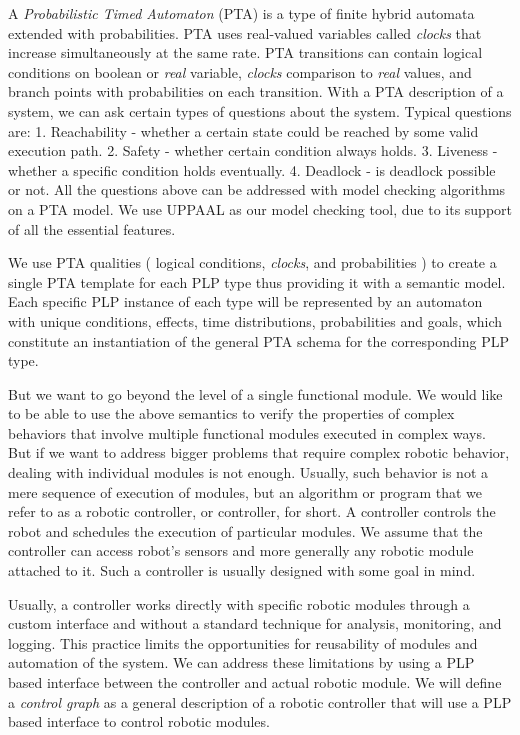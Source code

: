 \par A \textit{Probabilistic Timed Automaton} (PTA) is a type of finite hybrid automata extended with probabilities. PTA uses real-valued variables called \textit{clocks} that increase simultaneously at the same rate. PTA transitions can contain logical conditions on boolean or \textit{real} variable, \textit{clocks} comparison to \textit{real} values, and branch points with probabilities on each transition. With a PTA description of a system, we can ask certain types of questions about the system. Typical questions are: 1. Reachability - whether a certain state could be reached by some valid execution path. 2. Safety - whether certain condition always holds. 3. Liveness - whether a specific condition holds eventually. 4. Deadlock - is deadlock possible or not. All the questions above can be addressed with model checking algorithms on a PTA model. We use UPPAAL \cite{uppaalIntroduction} \cite{tutorialUppaal} as our model checking tool, due to its support of all the essential features.
\par We use PTA qualities ( logical conditions, \textit{clocks}, and probabilities ) to create a single PTA template for each PLP type thus providing it with a semantic model. Each specific PLP instance of each type will be represented by an automaton with unique conditions, effects, time distributions, probabilities and goals, which constitute an instantiation of the general PTA schema for the corresponding PLP type. 
\par But we want to go beyond the level of a single functional module. We would like to be able to use the above semantics to verify the properties of complex behaviors that involve multiple functional modules executed in complex ways. But if we want to address bigger problems that require complex robotic behavior, dealing with individual modules is not enough. Usually, such behavior is not a mere sequence of execution of modules, but an algorithm or program that we refer to as a robotic controller, or controller, for short. A controller controls the robot and schedules the execution of particular modules. We assume that the controller can access robot’s sensors and more generally any robotic module attached to it. Such a controller is usually designed with some goal in mind.
\par Usually, a controller works directly with specific robotic modules through a custom interface and without a standard technique for analysis, monitoring, and logging. This practice limits the opportunities for reusability of modules and automation of the system. We can address these limitations by using a PLP based interface between the controller and actual robotic module. We will define a \textit{control graph} as a general description of a robotic controller that will use a PLP based interface to control robotic modules. 
